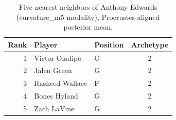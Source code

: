 \begin{table}[htbp]
  \centering\small
  \begin{tabular}{rllc}
    \toprule
    Rank & Player & Position & Archetype \\
    \midrule
    1 & Victor Oladipo & G & 2 \\
    2 & Jalen Green & G & 2 \\
    3 & Rasheed Wallace & F & 2 \\
    4 & Bones Hyland & G & 2 \\
    5 & Zach LaVine & G & 2 \\
    \bottomrule
  \end{tabular}
  \caption{Five nearest neighbors of Anthony Edwards (curvature_m5 modality), Procrustes-aligned posterior mean.}
  \label{tab:Anthony_Edwards_neighbors_curvature_m5}
\end{table}

